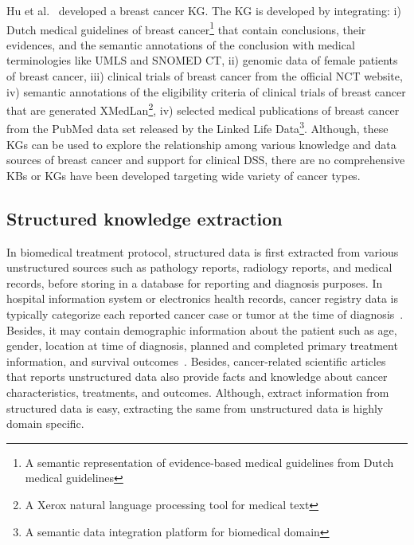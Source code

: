 \hspace*{3.5mm} Hu et al.~\cite{hu2015semantic} developed a breast cancer KG. The KG is developed by integrating: i) Dutch medical guidelines of breast cancer\footnote{A semantic representation of evidence-based medical guidelines from Dutch medical guidelines} that contain conclusions, their evidences, and the semantic annotations of the conclusion with medical terminologies like UMLS and SNOMED CT, ii) genomic data of female patients of breast cancer, iii) clinical trials of breast cancer from the official NCT website, iv) semantic annotations of the eligibility criteria of clinical trials of breast cancer that are generated XMedLan\footnote{A Xerox natural language processing tool for medical text}, iv) selected medical publications of breast cancer from the PubMed data set released by the Linked Life Data\footnote{A semantic data integration platform for biomedical domain}. 
Although, these KGs can be used to explore the relationship among various knowledge and data sources of breast cancer and support for clinical DSS, there are no comprehensive KBs or KGs have been developed targeting wide variety of cancer types. 

\subsection{Structured knowledge  extraction}
In biomedical treatment protocol, structured data is first extracted from various unstructured sources such as pathology reports, radiology reports, and medical records, before storing in a database for reporting and diagnosis purposes. In hospital information system or electronics health records, cancer registry data is typically categorize each reported cancer case or tumor at the time of diagnosis~\cite{hasan2020knowledge}. Besides, it may contain demographic information about the patient such as age, gender, location at time of diagnosis, planned and completed primary treatment information, and survival outcomes~\cite{hasan2020knowledge}. Besides, cancer-related scientific articles that reports unstructured data also provide facts and knowledge about cancer characteristics, treatments, and outcomes. Although, extract information from structured data is easy, extracting the same from unstructured data is highly domain specific. 

